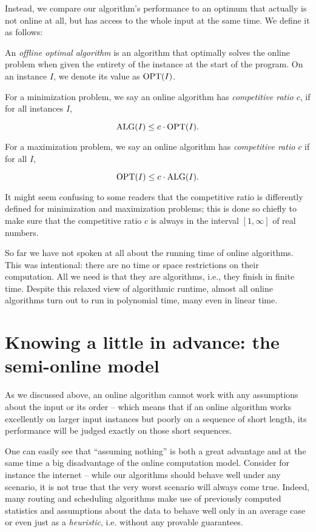 Instead, we compare our algorithm's performance to an optimum that
actually is not online at all, but has access to the whole input at
the same time. We define it as follows: 

\begin{dfn}\label{dfn:compratio}
An \emph{offline optimal algorithm} is an algorithm that optimally
solves the online problem when given the entirety of the instance at the start
of the program. On an instance $I$, we denote its value as $\mathrm{OPT}(I)$.

For a minimization problem, we say an online algorithm has
\emph{competitive ratio $c$}, if for all instances $I$,

\[ \mathrm{ALG}(I) \le c \cdot \mathrm{OPT}(I). \]

For a maximization problem, we say an online algorithm has
\emph{competitive ratio $c$} if for all $I$,

\[ \mathrm{OPT}(I) \le c \cdot \mathrm{ALG}(I). \]

\end{dfn}

It might seem confusing to some readers that the competitive ratio is
differently defined for minimization and maximization problems; this
is done so chiefly to make sure that the competitive ratio $c$ is
always in the interval $[1,\infty]$ of real numbers.

So far we have not spoken at all about the running time of online
algorithms. This was intentional: there are no time or space
restrictions on their computation. All we need is that they are
algorithms, i.e., they finish in finite time. Despite this relaxed
view of algorithmic runtime, almost all online algorithms turn out to
run in polynomial time, many even in linear time.


\section{Knowing a little in advance: the semi-online model}

As we discussed above, an online algorithm cannot work with any assumptions
about the input or its order -- which means that if an online algorithm works
excellently on larger input instances but poorly on a sequence of short length,
its performance will be judged exactly on those short sequences.

One can easily see that ``assuming nothing'' is both a great advantage
and at the same time a big disadvantage of the online computation
model. Consider for instance the internet -- while our algorithms
should behave well under any scenario, it is not true that the very
worst scenario will always come true. Indeed, many routing and
scheduling algorithms make use of previously computed statistics and
assumptions about the data to behave well only in an average case or
even just as a \textit{heuristic}, i.e. without any provable guarantees.

